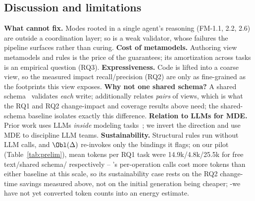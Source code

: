\subsection{Discussion and limitations}\label{subsec:discussion}

\noindent\textbf{What \tool{} cannot fix.} Modes rooted in a single agent's
reasoning (FM-1.1, 2.2, 2.6) are outside a coordination layer; so is a weak
validator, whose failures the pipeline surfaces rather than
curing. \textbf{Cost of metamodels.} Authoring view metamodels and rules is
the price of the guarantees; its amortization across tasks is an empirical
question (RQ3). \textbf{Expressiveness.} Code is lifted into a coarse
 view, so the measured impact recall/precision (RQ2) are only
as fine-grained as the footprints this view exposes. \textbf{Why not one shared schema?} A shared schema~\cite{zhang2026patchboard}
validates \emph{each} write; \tool{} additionally relates \emph{pairs} of
views, which is what the RQ1 and RQ2 change-impact and coverage results
above need; the shared-schema
baseline isolates exactly this difference.
\textbf{Relation to LLMs for MDE.} Prior
work uses LLMs \emph{inside} modeling
tasks~\cite{chaaben2023fewshot,chen2023domainmodeling,clariso2023mdpe}; we
invert the direction and use MDE to discipline LLM teams.
\textbf{Sustainability.} Structural rules run without LLM calls, and
$\Obl(\Delta)$ re-invokes only the bindings it flags;
on our  pilot (Table~\ref{tab:prelim}), mean tokens per RQ1
task were 14.9k/4.8k/25.5k for free text/shared schema/\tool{}
respectively -- \tool{}'s per-operation  calls cost more tokens
than either baseline at this scale, so its sustainability case rests on
the RQ2 change-time savings measured above, not on the
initial generation being cheaper; \hyp{we have not yet converted token
counts into an energy estimate.}
